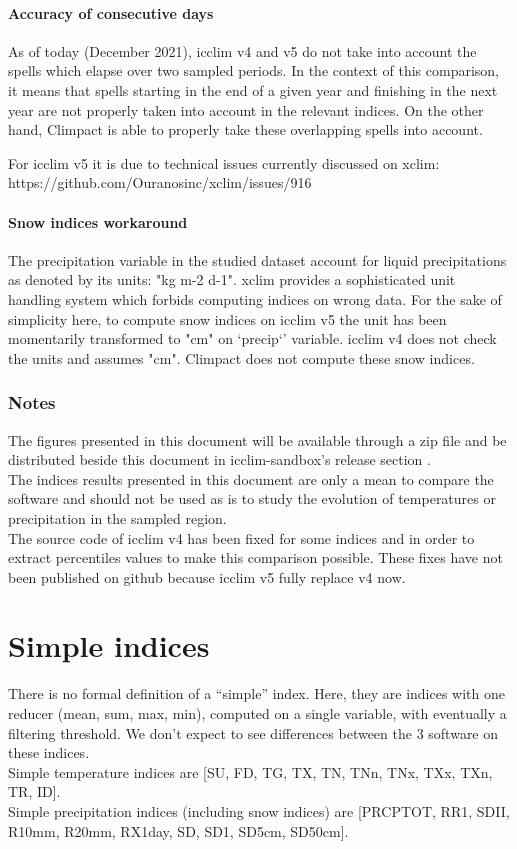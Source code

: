 \documentclass[a4paper,11pt]{article}
\begin{document}
        \subsection{Accuracy of consecutive days}
            As of today (December 2021), icclim v4 and v5 do not take into account the spells which elapse over two sampled periods. In the context of this comparison, it means that spells starting in the end of a given year and finishing in the next year are not properly taken into account in the relevant indices.
            On the other hand, Climpact is able to properly take these overlapping spells into account.

            For icclim v5 it is due to technical issues currently discussed on xclim: https://github.com/Ouranosinc/xclim/issues/916

        \subsection{Snow indices workaround}
            The precipitation variable in the studied dataset account for liquid precipitations as denoted by its units: "kg m-2 d-1".
            xclim provides a sophisticated unit handling system which forbids computing indices on wrong data. For the sake of simplicity here, to compute snow indices on icclim v5 the unit has been momentarily transformed to "cm" on `precip`' variable.
            icclim v4 does not check the units and assumes "cm".
            Climpact does not compute these snow indices.
            
    \section{Notes}
        The figures presented in this document will be available through a zip file and be distributed beside this document in icclim-sandbox's release section \cite{gh/icclim_sandbox}.\\
        The indices results presented in this document are only a mean to compare the software and should not be used as is to study the evolution of temperatures or precipitation in the sampled region.\\
        The source code of icclim v4 has been fixed for some indices and in order to extract percentiles values to make this comparison possible. These fixes have not been published on github because icclim v5 fully replace v4 now.


\part{Simple indices}
    There is no formal definition of a “simple” index. Here, they are indices with one reducer (mean, sum, max, min), computed on a single variable, with eventually a filtering threshold. 
    We don't expect to see differences between the 3 software on these indices.\\
    Simple temperature indices are [SU, FD, TG, TX, TN, TNn, TNx, TXx, TXn, TR, ID].\\
    Simple precipitation indices (including snow indices) are [PRCPTOT, RR1, SDII, R10mm, R20mm, RX1day, SD, SD1, SD5cm, SD50cm].\\
\end{document}
